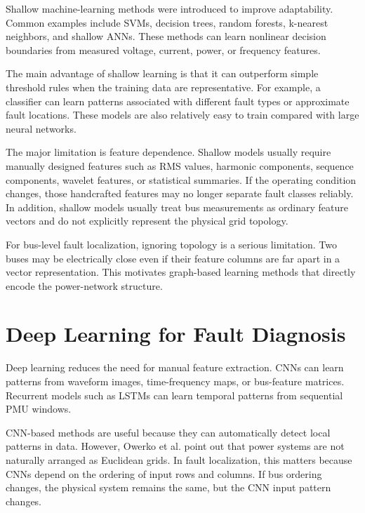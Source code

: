 \documentclass[12pt,a4paper]{article}
\begin{document}
Shallow machine-learning methods were introduced to improve adaptability. Common examples include SVMs, decision trees, random forests, k-nearest neighbors, and shallow ANNs. These methods can learn nonlinear decision boundaries from measured voltage, current, power, or frequency features.

The main advantage of shallow learning is that it can outperform simple threshold rules when the training data are representative. For example, a classifier can learn patterns associated with different fault types or approximate fault locations. These models are also relatively easy to train compared with large neural networks.

The major limitation is feature dependence. Shallow models usually require manually designed features such as RMS values, harmonic components, sequence components, wavelet features, or statistical summaries. If the operating condition changes, those handcrafted features may no longer separate fault classes reliably. In addition, shallow models usually treat bus measurements as ordinary feature vectors and do not explicitly represent the physical grid topology.

For bus-level fault localization, ignoring topology is a serious limitation. Two buses may be electrically close even if their feature columns are far apart in a vector representation. This motivates graph-based learning methods that directly encode the power-network structure.

\section{Deep Learning for Fault Diagnosis}

Deep learning reduces the need for manual feature extraction. CNNs can learn patterns from waveform images, time-frequency maps, or bus-feature matrices. Recurrent models such as LSTMs can learn temporal patterns from sequential PMU windows.

CNN-based methods are useful because they can automatically detect local patterns in data. However, Owerko et al. \cite{owerko2020} point out that power systems are not naturally arranged as Euclidean grids. In fault localization, this matters because CNNs depend on the ordering of input rows and columns. If bus ordering changes, the physical system remains the same, but the CNN input pattern changes.
\end{document}
